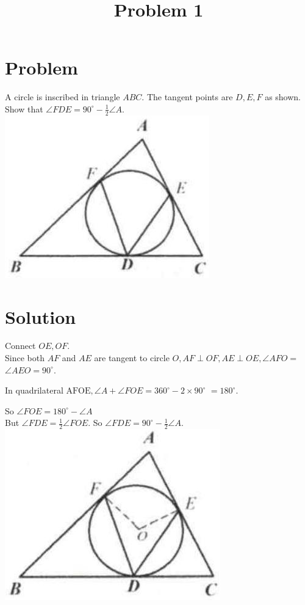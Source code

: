 \documentclass{article}
\title{Problem 1}
\date{}
\begin{document}
\maketitle

\section*{Problem}
A circle is inscribed in triangle \(A B C\). The tangent points are \(D, E, F\) as shown. Show that \(\angle F D E=90^{\circ}-\frac{1}{2} \angle A\).\\
\centering
\includegraphics[width=\textwidth]{images/problem_image_1.jpg}

\section*{Solution}
Connect \(O E, O F\).\\
Since both \(A F\) and \(A E\) are tangent to circle \(O, A F \perp O F, A E \perp O E, \angle A F O=\) \(\angle A E O=90^{\circ}\).

In quadrilateral \(\mathrm{AFOE}, \angle A+\angle F O E=360^{\circ}-2 \times 90^{\circ}\) \(=180^{\circ}\).

So \(\angle F O E=180^{\circ}-\angle A\)\\
But \(\angle F D E=\frac{1}{2} \angle F O E\). So \(\angle F D E=90^{\circ}-\frac{1}{2} \angle A\).\\
\centering
\includegraphics[width=\textwidth]{images/reasoning_image_1.jpg}
\end{document}
